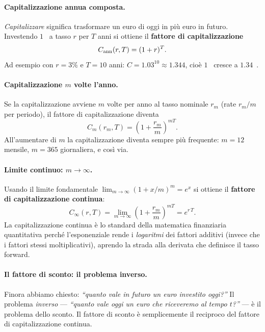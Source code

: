 \documentclass[11pt,a4paper]{article}
\theoremstyle{plain}
\theoremstyle{definition}
\theoremstyle{remark}
\begin{document}
\paragraph{Capitalizzazione annua composta.}
\emph{Capitalizzare} significa trasformare un euro di oggi in pi\`u euro in futuro.
Investendo $1$~\texteuro{} a tasso $r$ per $T$ anni si ottiene il
\textbf{fattore di capitalizzazione}
\[
  C_{\rm ann}(r,T) = (1+r)^T.
\]
Ad esempio con $r=3\%$ e $T=10$ anni: $C = 1.03^{10} \approx 1.344$, cio\`e $1$~\texteuro{}
cresce a $1.34$~\texteuro{}.

\paragraph{Capitalizzazione $m$ volte l'anno.}
Se la capitalizzazione avviene $m$ volte per anno al tasso nominale $r_m$ (rate $r_m/m$
per periodo), il fattore di capitalizzazione diventa
\[
  C_m(r_m,T) = \left(1 + \frac{r_m}{m}\right)^{mT}.
\]
All'aumentare di $m$ la capitalizzazione diventa sempre pi\`u frequente: $m=12$ mensile,
$m=365$ giornaliera, e cos\`i via.

\paragraph{Limite continuo: $m \to \infty$.}
Usando il limite fondamentale $\lim_{m\to\infty}(1+x/m)^m = e^x$ si ottiene il
\textbf{fattore di capitalizzazione continua}:
\begin{equation}
  C_\infty(r,T) = \lim_{m\to\infty}\left(1+\frac{r_m}{m}\right)^{mT} = e^{r\,T}.
  \label{eq:cap-cont}
\end{equation}
La capitalizzazione continua \`e lo standard della matematica finanziaria quantitativa
perch\'e l'esponenziale rende i \emph{logaritmi} dei fattori additivi (invece che i fattori
stessi moltiplicativi), aprendo la strada alla derivata che definisce il tasso forward.

\paragraph{Il fattore di sconto: il problema inverso.}
Finora abbiamo chiesto: \emph{``quanto vale in futuro un euro investito oggi?''} Il problema
\emph{inverso} --- \emph{``quanto vale oggi un euro che riceveremo al tempo $t$?''} --- \`e
il problema dello sconto. Il fattore di sconto \`e semplicemente il reciproco del fattore
di capitalizzazione continua.
\end{document}
